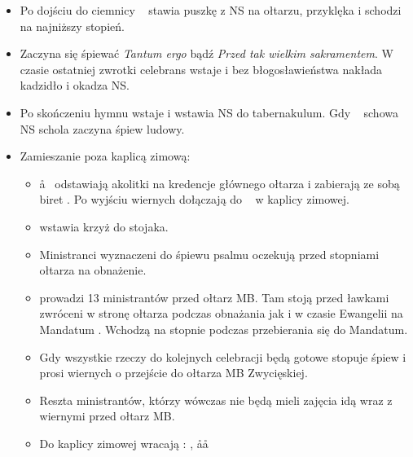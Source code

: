 \begin{itemize}
      \item Po dojściu do ciemnicy \ii~ stawia puszkę z NS na ołtarzu, przyklęka
            i schodzi na najniższy stopień.
      \item Zaczyna się śpiewać \textit{Tantum ergo} bądź \textit{Przed tak
                  wielkim sakramentem}. W czasie ostatniej zwrotki celebrans
            wstaje i bez błogosławieństwa nakłada kadzidło i okadza NS.
      \item Po skończeniu hymnu wstaje i wstawia NS do tabernakulum. Gdy \ii~
            schowa NS schola zaczyna śpiew ludowy.
      \item Zamieszanie poza kaplicą zimową:
            \begin{itemize}
                  \item \aa~ odstawiają akolitki na kredencje głównego
                        ołtarza i zabierają ze sobą biret \ii. Po wyjściu
                        wiernych dołączają do \ii~ w kaplicy zimowej.
                  \item {} wstawia krzyż do stojaka.
                  \item Ministranci wyznaczeni do śpiewu psalmu oczekują przed
                        stopniami ołtarza na obnażenie.
                  \item {} prowadzi 13 ministrantów przed ołtarz MB. Tam stoją
                        przed ławkami zwróceni w stronę ołtarza podczas
                        obnażania jak i w czasie Ewangelii na Mandatum . Wchodzą
                        na stopnie podczas przebierania się \ii do Mandatum.
                  \item Gdy wszystkie rzeczy do kolejnych celebracji będą
                        gotowe  stopuje śpiew i prosi wiernych o przejście
                        do ołtarza MB Zwycięskiej.
                  \item Reszta ministrantów, którzy wówczas nie będą mieli
                        zajęcia idą wraz z wiernymi przed ołtarz MB.
                  \item Do kaplicy zimowej wracają : , \aa\aa
            \end{itemize}
\end{itemize}
